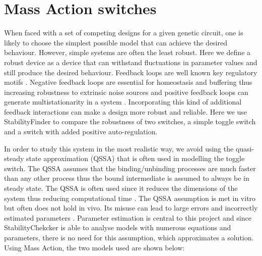 \section{Mass Action switches}

When faced with a set of competing designs for a given genetic circuit, one is likely to choose the simplest possible model that can achieve the desired behaviour. However, simple systems are often the least robust. Here we define a robust device as a device that can withstand fluctuations in parameter values and still produce the desired behaviour. Feedback loops are well known key regulatory motifs \autocite{Brandman:2005ci}. Negative feedback loops are essential for homeostasis and buffering \autocite{Thomas:1995id} thus increasing robustness to extrinsic noise sources and positive feedback loops can generate multistationarity in a system \autocite{Thomas:1995id}. Incorporating this kind of additional feedback interactions can make a design more robust and reliable. Here we use StabilityFinder to compare the robustness of two switches, a simple toggle switch and a switch with added positive auto-regulation. 

In order to study this system in the most realistic way, we avoid using the quasi-steady state approximation (QSSA) that is often used in modelling the toggle switch. The QSSA assumes that the binding/unbinding processes are much faster than any other process \autocite{Loinger:2007vma} thus the bound intermediate is assumed to always be in steady state. The QSSA is often used since it reduces the dimensions of the system thus reducing computational time \autocite{Pedersen:2007ke}. The QSSA assumption is met in vitro but often does not hold in vivo. Its misuse can lead to large errors and incorrectly estimated parameters \autocite{Pedersen:2007ke}. Parameter estimation is central to this project and since StabilityChekcker is able to analyse models with numerous equations and parameters, there is no need for this assumption, which approximates a solution. Using Mass Action, the two models used are shown below:


